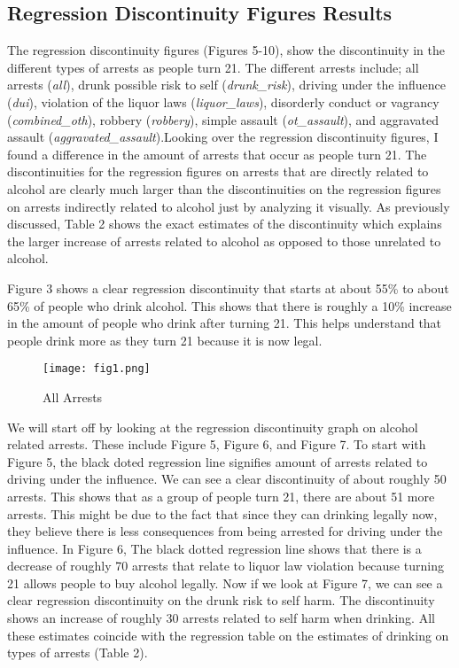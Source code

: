 \documentclass[a4paper]{article}
\begin{document}
\subsection{Regression Discontinuity Figures Results}
The regression discontinuity figures (Figures 5-10), show the discontinuity in the different types of arrests as people turn 21. The different arrests include; all arrests (\textit{all}), drunk possible risk to self (\textit{drunk\_risk}), driving under the influence (\textit{dui}), violation of the liquor laws (\textit{liquor\_laws}), disorderly conduct or vagrancy (\textit{combined\_oth}), robbery (\textit{robbery}), simple assault (\textit{ot\_assault}), and aggravated assault (\textit{aggravated\_assault}).Looking over the regression discontinuity figures, I found a difference in the amount of arrests that occur as people turn 21. The discontinuities for the regression figures on arrests that are directly related to alcohol are clearly much larger than the discontinuities on the regression figures on arrests indirectly related to alcohol just by analyzing it visually. As previously discussed, Table 2 shows the exact estimates of the discontinuity which explains the larger increase of arrests related to alcohol as opposed to those unrelated to alcohol.  
\par
Figure 3 shows a clear regression discontinuity that starts at about 55\% to about 65\% of people who drink alcohol. This shows that there is roughly a 10\% increase in the amount of people who drink after turning 21. This helps understand that people drink more as they turn 21 because it is now legal. 

\begin{figure}[H]
    \centering
    \caption{All Arrests}
    \texttt{[image: fig1.png]}
    \label{fig:my_label}
\end{figure}

\par
We will start off by looking at the regression discontinuity graph on alcohol related arrests. These include Figure 5, Figure 6, and Figure 7. To start with Figure 5, the black doted regression line signifies amount of arrests related to driving under the influence. We can see a clear discontinuity of about roughly 50 arrests. This shows that as a group of people turn 21, there are about 51 more arrests. This might be due to the fact that since they can drinking legally now, they believe there is less consequences from being arrested for driving under the influence. In Figure 6, The black dotted regression line shows that there is a decrease of roughly 70 arrests that relate to liquor law violation because turning 21 allows people to buy alcohol legally. Now if we look at Figure 7, we can see a clear regression discontinuity on the drunk risk to self harm. The discontinuity shows an increase of roughly 30 arrests related to self harm when drinking. All these estimates coincide with the regression table on the estimates of drinking on types of arrests (Table 2).
\end{document}
